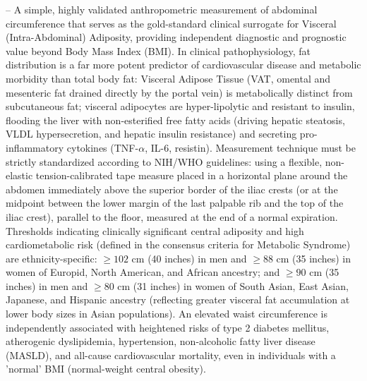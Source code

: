 -- A simple, highly validated anthropometric measurement of abdominal circumference that serves as the gold-standard clinical surrogate for Visceral (Intra-Abdominal) Adiposity, providing independent diagnostic and prognostic value beyond Body Mass Index (BMI). In clinical pathophysiology, fat distribution is a far more potent predictor of cardiovascular disease and metabolic morbidity than total body fat: Visceral Adipose Tissue (VAT, omental and mesenteric fat drained directly by the portal vein) is metabolically distinct from subcutaneous fat; visceral adipocytes are hyper-lipolytic and resistant to insulin, flooding the liver with non-esterified free fatty acids (driving hepatic steatosis, VLDL hypersecretion, and hepatic insulin resistance) and secreting pro-inflammatory cytokines (TNF-$\alpha$, IL-6, resistin). Measurement technique must be strictly standardized according to NIH/WHO guidelines: using a flexible, non-elastic tension-calibrated tape measure placed in a horizontal plane around the abdomen immediately above the superior border of the iliac crests (or at the midpoint between the lower margin of the last palpable rib and the top of the iliac crest), parallel to the floor, measured at the end of a normal expiration. Thresholds indicating clinically significant central adiposity and high cardiometabolic risk (defined in the consensus criteria for Metabolic Syndrome) are ethnicity-specific: $\ge 102$ cm (40 inches) in men and $\ge 88$ cm (35 inches) in women of Europid, North American, and African ancestry; and $\ge 90$ cm (35 inches) in men and $\ge 80$ cm (31 inches) in women of South Asian, East Asian, Japanese, and Hispanic ancestry (reflecting greater visceral fat accumulation at lower body sizes in Asian populations). An elevated waist circumference is independently associated with heightened risks of type 2 diabetes mellitus, atherogenic dyslipidemia, hypertension, non-alcoholic fatty liver disease (MASLD), and all-cause cardiovascular mortality, even in individuals with a 'normal' BMI (normal-weight central obesity).

